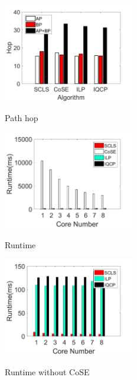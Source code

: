 \begin{figure}[tp]
\centering
\begin{minipage}[t]{0.3\linewidth}
\centering
\includegraphics[width=2.25in]{franz/hop}
\caption{Path hop}
\label{fig:normalization hop}
\end{minipage}
\hfill
\begin{minipage}[t]{0.3\linewidth}
\centering
\includegraphics[width=2.25in]{franz/runtime}
\caption{Runtime}
\label{fig:normalization runtime}
\end{minipage}
\hfill
\begin{minipage}[t]{0.3\linewidth}
\centering
\includegraphics[width=2.25in]{franz/Runtime_noKSP_noCOSE}\\
  \caption{Runtime without CoSE}\label{fig:Runtime_noKSP_noCOSE}
\end{minipage}

\end{figure}


